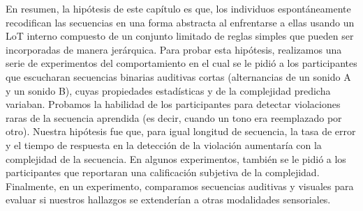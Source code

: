 En resumen, la hipótesis de este capítulo es que, los individuos espontáneamente recodifican las secuencias en una forma abstracta al enfrentarse a ellas usando un LoT interno compuesto de un conjunto limitado de reglas simples que pueden ser incorporadas de manera jerárquica. Para probar esta hipótesis, realizamos una serie de experimentos del comportamiento en el cual se le pidió a los participantes que escucharan secuencias binarias auditivas cortas (alternancias de un sonido A y un sonido B), cuyas propiedades estadísticas y de la complejidad predicha variaban. Probamos la habilidad de los participantes para detectar violaciones raras de la secuencia aprendida (es decir, cuando un tono era reemplazado por otro). Nuestra hipótesis fue que, para igual longitud de secuencia, la tasa de error y el tiempo de respuesta en la detección de la violación aumentaría con la complejidad de la secuencia. En algunos experimentos, también se le pidió a los participantes que reportaran una calificación subjetiva de la complejidad. Finalmente, en un experimento, comparamos secuencias auditivas y visuales para evaluar si nuestros hallazgos se extenderían a otras modalidades sensoriales.


